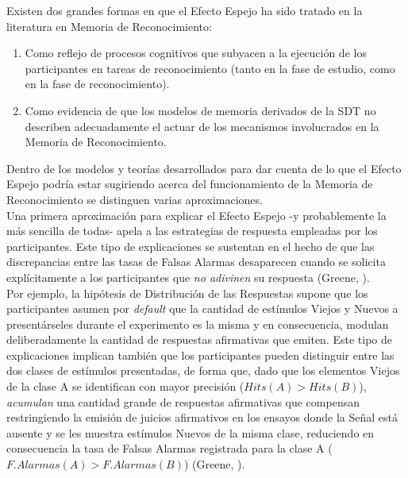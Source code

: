 Existen dos grandes formas en que el Efecto Espejo ha sido tratado en la literatura en Memoria de Reconocimiento:\\

\begin{enumerate}
\item Como reflejo de procesos cognitivos que subyacen a la ejecución de los participantes en tareas de reconocimiento (tanto en la fase de estudio, como en la fase de reconocimiento).\\

\item Como evidencia de que los modelos de memoria derivados de la SDT no describen adecuadamente el actuar de los mecanismos involucrados en la Memoria de Reconocimiento.\\
\end{enumerate}

Dentro de los modelos y teorías desarrollados para dar cuenta de lo que el Efecto Espejo podría estar sugiriendo acerca del funcionamiento de la Memoria de Reconocimiento se distinguen varias aproximaciones.\\

Una primera aproximación para explicar el Efecto Espejo -y probablemente la más sencilla de todas- apela a las estrategias de respuesta empleadas por los participantes. Este tipo de explicaciones se sustentan en el hecho de que las discrepancias entre las tasas de Falsas Alarmas desaparecen cuando se solicita explícitamente a los participantes que \textit{no adivinen} su respuesta (Greene, \citeyear{Greene1996}).\\

Por ejemplo, la hipótesis de Distribución de las Respuestas supone que los participantes asumen por \textit{default} que la cantidad de estímulos Viejos y Nuevos a presentárseles durante el experimento es la misma y en consecuencia, modulan deliberadamente la cantidad de respuestas afirmativas que emiten. Este tipo de explicaciones implican también que los participantes pueden distinguir entre las dos clases de estímulos presentadas, de forma que, dado que los elementos Viejos de la clase A se identifican con mayor precisión ($Hits(A) > Hits(B)$), \textit{acumulan} una cantidad grande de respuestas afirmativas que compensan restringiendo la emisión de juicios afirmativos en los ensayos donde la Señal está ausente y se les muestra estímulos Nuevos de la misma clase, reduciendo en consecuencia la tasa de Falsas Alarmas registrada para la clase A ($F.Alarmas(A) > F.Alarmas(B)$) (Greene, \citeyear{Greene1996}).\\

